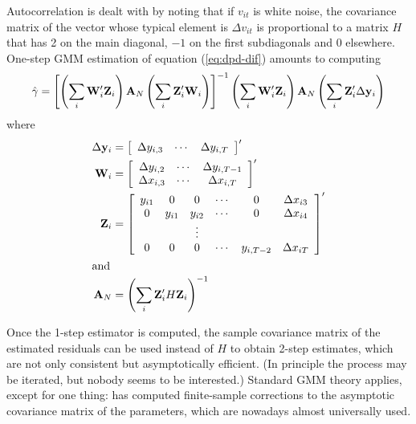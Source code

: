 Autocorrelation is dealt with by noting that if $v_{it}$ is white
noise, the covariance matrix of the vector whose typical element is
$\Delta v_{it}$ is proportional to a matrix $H$ that has 2 on the main
diagonal, $-1$ on the first subdiagonals and 0 elsewhere.  One-step
GMM estimation of equation (\ref{eq:dpd-dif}) amounts to computing
\begin{equation}
\label{eq:dif-gmm}
  \hat{\gamma} = \left[ 
    \left( \sum_i \mathbf{W}_i'\mathbf{Z}_i \right) \mathbf{A}_N
    \left( \sum_i \mathbf{Z}_i'\mathbf{W}_i \right) \right]^{-1} 
    \left( \sum_i \mathbf{W}_i'\mathbf{Z}_i \right) \mathbf{A}_N
    \left( \sum_i \mathbf{Z}_i'\Delta \mathbf{y}_i \right)
\end{equation}
where
\begin{align*}
  \Delta \mathbf{y}_i  & =
     \left[ \begin{array}{ccc}
         \Delta y_{i,3} & \cdots & \Delta y_{i,T}
       \end{array} \right]' \\
  \mathbf{W}_i  & = 
     \left[ \begin{array}{ccc}
         \Delta y_{i,2} & \cdots & \Delta y_{i,T-1} \\
         \Delta x_{i,3} & \cdots & \Delta x_{i,T} \\
       \end{array} \right]' \\
  \mathbf{Z}_i  & = 
     \left[ \begin{array}{ccccccc}
         y_{i1} & 0 & 0 & \cdots & 0 & \Delta x_{i3}\\
         0 & y_{i1} & y_{i2} & \cdots & 0 & \Delta x_{i4}\\
         & & \vdots \\
         0 & 0 & 0 & \cdots & y_{i, T-2} & \Delta x_{iT} \\
       \end{array} \right]' \\
  \intertext{and}
  \mathbf{A}_N & = \left( \sum_i \mathbf{Z}_i' H \mathbf{Z}_i \right)^{-1}
\end{align*}

Once the 1-step estimator is computed, the sample covariance matrix of
the estimated residuals can be used instead of $H$ to obtain 2-step
estimates, which are not only consistent but asymptotically
efficient. (In principle the process may be iterated, but nobody seems
to be interested.) Standard GMM theory applies, except for one thing:
\cite{Windmeijer05} has computed finite-sample corrections to the
asymptotic covariance matrix of the parameters, which are nowadays
almost universally used.

